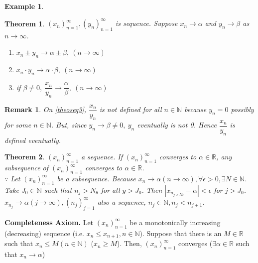 \documentclass[a4paper,10pt]{article}
\newtheorem{remark}{Remark}
\newtheorem{theo}{Theorem}
\newtheorem{ex}{Example}
\newcommand{\R}{\mathbb{R}}
\newcommand{\N}{\mathbb{N}}
\begin{document}
\begin{ex}
	
\end{ex}

\begin{theo}
	$ (x_{n})_{n=1}^{\infty} , (y_{n})_{n=1}^{\infty} $ is sequence. Suppose $ x_{n} \rightarrow \alpha $ and $ y_{n} \rightarrow \beta $ as $ n\rightarrow \infty $.
	\begin{enumerate}
		\item $ x_{n} \pm y_{n} \rightarrow \alpha \pm \beta , \ (n \rightarrow \infty) $
		\item $ x_{n} \cdot y_{n} \rightarrow \alpha \cdot \beta , \ (n \rightarrow \infty) $
		\item \label{theoseq3} if $ \beta \neq 0, \ \dfrac{x_{n}}{y_{n}} \rightarrow \dfrac{\alpha}{\beta} , \ (n \rightarrow \infty) $
	\end{enumerate}
\end{theo}

\begin{remark}
	On \ref{theoseq3}, $ \dfrac{x_{n}}{y_{n}} $ is not defined for all $ n \in \N $ because $ y_{n}=0 $ possibly for some $ n \in \N $. But, since $ y_{n} \rightarrow \beta \neq 0, \ y_{n} $ eventually is not 0. Hence $ \dfrac{x_{n}}{y_{n}} $ is defined eventually.
\end{remark}

\begin{theo}
	$ (x_{n})_{n=1}^{\infty} $ a sequence. If $ (x_{n})_{n=1}^{\infty} $ converges to $ \alpha \in \R $, any subsequence of $ (x_{n})_{n=1}^{\infty} $ converges to $ \alpha \in \R $.\\
	$ \because $ Let $ (x_{n})_{n=1}^{\infty} $ be a subsequence. Because $ x_{n} \rightarrow \alpha (n\rightarrow \infty), \forall\epsilon>0, \exists N \in \mathbb{N} $. Take $ J_{0} \in \mathbb{N} $ such that $ n_{j}>N_{\theta} $ for all $ y > J_{0} $. Then $ |x_{n_{j>N_{\theta}}}-\alpha|<\epsilon $ for $ j>J_{0} $. $ x_{n_{j}} \rightarrow \alpha (j \rightarrow \infty), (n_{j})_{j=1}^{\infty} $ also a sequence, $ n_{j} \in \mathbb{N}, n_{j}<n_{j+1} $.
\end{theo}

\textbf{Completeness Axiom.} Let $ (x_{n})_{n=1}^{\infty} $ be a monotonically increasing (decreasing) sequence (i.e. $ x_{n} \leq x_{n+1}, n\in \mathbb{N} $). Suppose that there is an $ M \in \R $ such that $ x_{n} \leq M (n \in \mathbb{N}) $ ($ x_{n} \geq M $). Then, $ (x_{n})_{n=1}^{\infty} $ converges ($ \exists \alpha\in\R $ such that $ x_{n}\rightarrow \alpha $)
\end{document}
